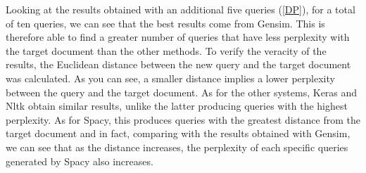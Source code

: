 Looking at the results obtained with an additional five queries (\ref{DP}), for a total 
of ten queries, we can see that the best results come from Gensim. This is 
therefore able to find a greater number of queries that have less perplexity 
with the target document than the other methods. To verify the veracity 
of the results, the Euclidean distance between the new query and the target 
document was calculated. As you can see, a smaller distance implies a lower 
perplexity between the query and the target document. As for the other 
systems, Keras and Nltk obtain similar results, unlike the latter producing 
queries with the highest perplexity. As for Spacy, this produces queries with 
the greatest distance from the target document and in fact, comparing with 
the results obtained with Gensim, we can see that as the distance increases, 
the perplexity of each specific queries generated by Spacy also increases.
